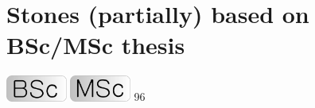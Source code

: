 \documentclass[a4paper,11pt]{report}
\begin{document}
\section{
Stones (partially) based on BSc/MSc thesis}

\includegraphics[width=2cm]{images/pictograms/bsc}
\includegraphics[width=2cm]{images/pictograms/msc}
96






\printbibliography

\newpage
{}
\end{document}
